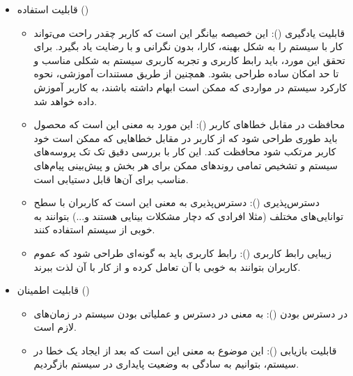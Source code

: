 {\begin{enumerate}[a)]
\begin{itemize}
\begin{itemize}
		\end{itemize}
		
		\item
		قابلیت استفاده ()
		
		\begin{itemize}
			
			\item 
			قابلیت یادگیری (): این خصیصه بیانگر این است که کاربر چقدر راحت می‌تواند کار با سیستم را به شکل بهینه، کارا، بدون نگرانی و با رضایت یاد بگیرد. برای تحقق این مورد، باید رابط کاربری و تجربه کاربری سیستم به شکلی مناسب و تا حد امکان ساده طراحی بشود. همچنین از طریق مستندات آموزشی، نحوه کارکرد سیستم در مواردی که ممکن است ابهام داشته باشند، به کاربر آموزش داده خواهد شد.
			
			\item
			محافظت در مقابل خطاهای کاربر (): این مورد به معنی این است که محصول باید طوری طراحی شود که از کاربر در مقابل خطاهایی که ممکن است خود کاربر مرتکب شود محافظت کند. این کار با بررسی دقیق تک تک پروسه‌های سیستم و تشخیص تمامی روندهای ممکن برای هر بخش و پیش‌بینی پیام‌های مناسب برای آن‌ها قابل دستیابی است.
			
			\item 
			دسترس‌پذیری (): دسترس‌‌پذیری به معنی این است که کاربران با سطح توانایی‌های مختلف (مثلا افرادی که دچار مشکلات بینایی هستند و...) بتوانند به خوبی از سیستم استفاده کنند.
			
			
			\item 
			زیبایی رابط کاربری (): رابط کاربری باید به گونه‌ای طراحی شود که عموم کاربران بتوانند به خوبی با آن تعامل کرده و از کار با آن لذت ببرند. 
			
			
		\end{itemize}
		
		
		\item
		قابلیت اطمینان ()
		
		\begin{itemize}
			\item 
			
			در دسترس بودن (): به معنی در دسترس و عملیاتی بودن سیستم در زمان‌های لازم است.
			
			\item
			قابلیت بازیابی (): این موضوع به معنی این است که بعد از ایجاد یک خطا در سیستم، بتوانیم به سادگی به وضعیت پایداری در سیستم بازگردیم.
		\end{itemize}
		

\end{itemize}
\end{enumerate}}

